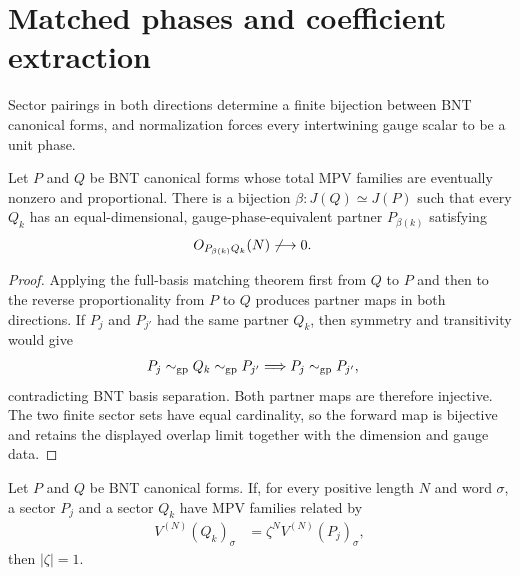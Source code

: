 \section{Matched phases and coefficient extraction}
\label{sec:app_ft_matched_phases}

Sector pairings in both directions determine a finite bijection between BNT
canonical forms, and normalization forces every intertwining gauge scalar to be
a unit phase.

\begin{lemma}
    \label{thm:sector_bnt_proportional_bijective_match}
    \leanok
    Let $P$ and $Q$ be BNT canonical forms whose total MPV families are
    eventually nonzero and proportional. There is a bijection
    $\beta:J(Q)\simeq J(P)$ such that every $Q_k$ has an equal-dimensional,
    gauge-phase-equivalent partner $P_{\beta(k)}$ satisfying
    \begin{align}
        O_{P_{\beta(k)}Q_k}(N)
         & \not\longrightarrow 0.
        \notag
    \end{align}
\end{lemma}

\begin{proof}\leanok
    Applying the full-basis matching theorem first from $Q$ to $P$ and then to
    the reverse proportionality from $P$ to $Q$ produces partner maps in both
    directions. If $P_j$ and $P_{j'}$ had the same partner $Q_k$, then symmetry
    and transitivity would give
    \begin{align}
        P_j\sim_{\mathrm{gp}}Q_k\sim_{\mathrm{gp}}P_{j'}
         & \Longrightarrow P_j\sim_{\mathrm{gp}}P_{j'},
        \notag
    \end{align}
    contradicting BNT basis separation. Both partner maps are therefore
    injective. The two finite sector sets have equal cardinality, so the forward
    map is bijective and retains the displayed overlap limit together with the
    dimension and gauge data.
\end{proof}

\begin{lemma}%
    \label{lem:sector_bnt_norm_phase_of_matched_mpv}
    \leanok
    Let $P$ and $Q$ be BNT canonical forms. If, for every positive length $N$
    and word $\sigma$, a sector $P_j$ and a sector $Q_k$ have MPV families
    related by
    \begin{align}
        V^{(N)}(Q_k)_\sigma
         & = \zeta^N V^{(N)}(P_j)_\sigma,
        \label{eq:ft_matched_mpv_phase_norm}
    \end{align}
    then $|\zeta|=1$.
\end{lemma}

